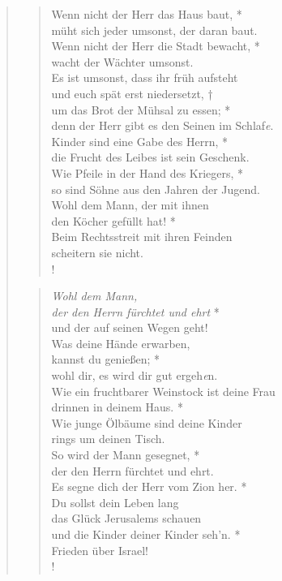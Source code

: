 \begin{quote}
\begin{verse}
Wenn nicht der Herr das Haus baut, *\\
müht sich jeder umsonst, der daran baut.\\
\vin Wenn nicht der Herr die Stadt bewacht, *\\
\vin wacht der Wächter umsonst.\\
Es ist umsonst, dass ihr früh aufsteht\\
und euch spät erst niedersetzt, †\\
um das Brot der Mühsal zu essen; *\\
denn der Herr gibt es den Seinen im Schlaf\textit{e}.\\
\vin Kinder sind eine Gabe des Herrn, *\\
\vin die Frucht des Leibes ist sein Geschenk.\\
Wie Pfeile in der Hand des Kriegers, *\\
so sind Söhne aus den Jahren der Jugend.\\
\vin Wohl dem Mann, der mit ihnen\\ 
\vin den Köcher gefüllt hat! *\\
\vin Beim Rechtsstreit mit ihren Feinden\\ 
\vin scheitern sie nicht.\\!
\end{verse}



\begin{verse}


\smallskip

\textit{Wohl dem Mann,\\
der den Herrn fürchtet und ehrt} *\\
und der auf seinen Wegen geht!\\
\vin Was deine Hände erwarben,\\ 
\vin kannst du genießen; *\\
\vin wohl dir, es wird dir gut ergeh\textit{e}n.\\
Wie ein fruchtbarer Weinstock ist deine Frau\\
drinnen in deinem Haus. *\\
Wie junge Ölbäume sind deine Kinder\\
rings um deinen Tisch.\\
\vin So wird der Mann gesegnet, *\\
\vin der den Herrn fürchtet und ehrt.\\
Es segne dich der Herr vom Zion her. *\\
Du sollst dein Leben lang\\
das Glück Jerusalems schauen\\
\vin und die Kinder deiner Kinder seh’n. *\\
\vin Frieden über Israel!\\!

\end{verse}
\end{quote}
